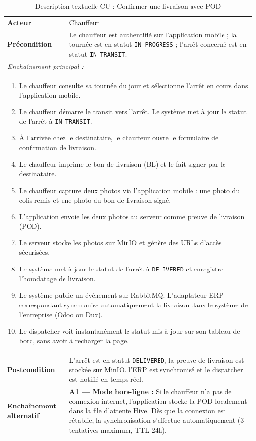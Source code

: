 \begin{longtable}{|p{3.5cm}|p{11.5cm}|}
\caption{Description textuelle CU : Confirmer une livraison avec POD} \\
\hline
\rowcolor{primary!10}
\multicolumn{2}{|c|}{\textbf{CU : Confirmer une livraison avec capture de preuve (POD)}} \\
\hline
\textbf{Acteur} & Chauffeur \\
\hline
\textbf{Précondition} &
  Le chauffeur est authentifié sur l'application mobile ; la tournée
  est en statut \texttt{IN\_PROGRESS} ; l'arrêt concerné est en
  statut \texttt{IN\_TRANSIT}. \\
\hline
\multicolumn{2}{|l|}{\textit{Enchaînement principal :}} \\
\hline
\multicolumn{2}{|p{15.4cm}|}{
  \begin{enumerate}[leftmargin=1.5cm]
    \item Le chauffeur consulte sa tournée du jour et sélectionne
          l'arrêt en cours dans l'application mobile.
    \item Le chauffeur démarre le transit vers l'arrêt. Le système
          met à jour le statut de l'arrêt à \texttt{IN\_TRANSIT}.
    \item À l'arrivée chez le destinataire, le chauffeur ouvre le
          formulaire de confirmation de livraison.
    \item Le chauffeur imprime le bon de livraison (BL) et le fait
          signer par le destinataire.
    \item Le chauffeur capture deux photos via l'application mobile :
          une photo du colis remis et une photo du bon de livraison signé.
    \item L'application envoie les deux photos au serveur comme
          preuve de livraison (POD).
    \item Le serveur stocke les photos sur MinIO et génère des URLs
          d'accès sécurisées.
    \item Le système met à jour le statut de l'arrêt à \texttt{DELIVERED}
          et enregistre l'horodatage de livraison.
    \item Le système publie un événement sur RabbitMQ. L'adaptateur ERP
          correspondant synchronise automatiquement la livraison dans
          le système de l'entreprise (Odoo ou Dux).
    \item Le dispatcher voit instantanément le statut mis à jour
          sur son tableau de bord, sans avoir à recharger la page.
  \end{enumerate}
} \\
\hline
\textbf{Postcondition} &
  L'arrêt est en statut \texttt{DELIVERED}, la preuve de livraison
  est stockée sur MinIO, l'ERP est synchronisé et le dispatcher
  est notifié en temps réel. \\
\hline
\textbf{Enchaînement alternatif} &
  \textbf{A1 — Mode hors-ligne :} Si le chauffeur n'a pas de connexion
  internet, l'application stocke la POD localement dans la file
  d'attente Hive. Dès que la connexion est rétablie, la synchronisation
  s'effectue automatiquement (3 tentatives maximum, TTL 24h).


\end{longtable}

